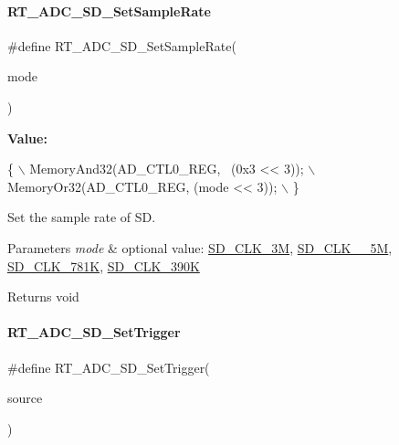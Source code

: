 \paragraph{\texorpdfstring{R\+T\+\_\+\+A\+D\+C\+\_\+\+S\+D\+\_\+\+Set\+Sample\+Rate}{RT\_ADC\_SD\_SetSampleRate}}
{\footnotesize\ttfamily \#define R\+T\+\_\+\+A\+D\+C\+\_\+\+S\+D\+\_\+\+Set\+Sample\+Rate(\begin{DoxyParamCaption}\item[{}]{mode }\end{DoxyParamCaption})}

{\bfseries Value\+:}
\begin{DoxyCode}
\{                                          \(\backslash\)
        MemoryAnd32(AD\_CTL0\_REG, ~(0x3 << 3)); \(\backslash\)
        MemoryOr32(AD\_CTL0\_REG, (mode << 3));  \(\backslash\)
    \}
\end{DoxyCode}


Set the sample rate of SD. 


\begin{DoxyParams}{Parameters}
{\em mode} & optional value\+: \mbox{\hyperlink{a00002_aebc3424fa91b715741f0320561ecfbb0a720c5991be73063f5ab035440f26b486}{S\+D\+\_\+\+C\+L\+K\+\_\+3M}}, \mbox{\hyperlink{a00002_aebc3424fa91b715741f0320561ecfbb0a5241c8457df3f987f10797b36db20771}{S\+D\+\_\+\+C\+L\+K\+\_\+\_\+5M}}, \mbox{\hyperlink{a00002_aebc3424fa91b715741f0320561ecfbb0a37bbada3115f676b49cc087c5caac0d3}{S\+D\+\_\+\+C\+L\+K\+\_\+781K}}, \mbox{\hyperlink{a00002_aebc3424fa91b715741f0320561ecfbb0ace583ebd6e97c856a883187711ea4226}{S\+D\+\_\+\+C\+L\+K\+\_\+390K}} \\
\hline
\end{DoxyParams}
\begin{DoxyReturn}{Returns}
void 
\end{DoxyReturn}
\mbox{\label{a00002_a11bf38478bd196acd1f179115e714dfc}} 
\paragraph{\texorpdfstring{R\+T\+\_\+\+A\+D\+C\+\_\+\+S\+D\+\_\+\+Set\+Trigger}{RT\_ADC\_SD\_SetTrigger}}
{\footnotesize\ttfamily \#define R\+T\+\_\+\+A\+D\+C\+\_\+\+S\+D\+\_\+\+Set\+Trigger(\begin{DoxyParamCaption}\item[{}]{source }\end{DoxyParamCaption})}

